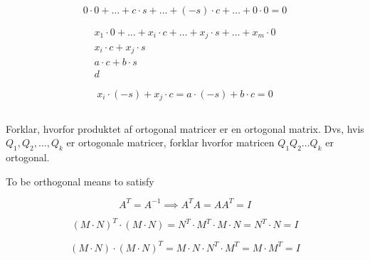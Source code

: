 \documentclass{article}
\begin{document}
\begin{equation}
    0 \cdot 0 + \dots + c \cdot s + \dots + (-s) \cdot c + \dots + 0 \cdot 0 = 0
\end{equation}

\begin{equation}
    \begin{array}{c}
        x_1 \cdot 0 + \dots + x_i \cdot c + \dots + x_j \cdot s + \dots + x_m \cdot 0 \\
        x_i \cdot c + x_j \cdot s \\
        a \cdot c + b \cdot s \\
        d
    \end{array}
\end{equation}

\begin{equation}
    x_i \cdot (-s) + x_j \cdot c = a \cdot (-s) + b \cdot c = 0
\end{equation}

\subsection{}
Forklar, hvorfor produktet af ortogonal matricer er en ortogonal matrix. Dvs, hvis $Q_1,Q_2, \dots ,Q_k$ er ortogonale matricer, forklar hvorfor matricen $Q_1Q_2 \dots Q_k$ er ortogonal.

To be orthogonal means to satisfy

\begin{equation}
    A^T = A^{-1} \implies A^TA=AA^T=I
\end{equation}

\begin{equation}
    (M \cdot N)^T \cdot (M \cdot N) = N^T \cdot M^T \cdot M \cdot N = N^T \cdot N = I
\end{equation}

\begin{equation}
    (M \cdot N) \cdot (M \cdot N)^T = M \cdot N \cdot N^T \cdot M^T = M \cdot M^T = I
\end{equation}
\end{document}
